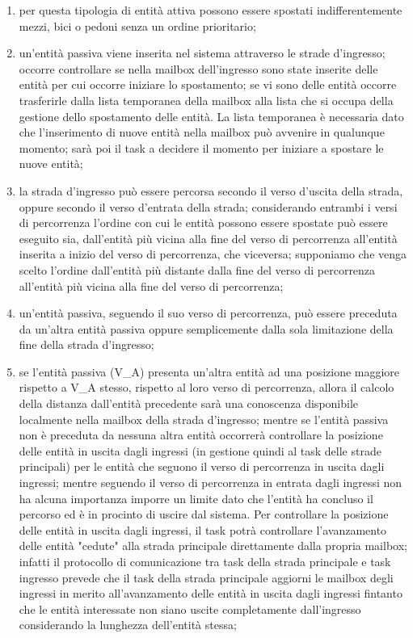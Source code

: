 \begin{enumerate}
\item per questa tipologia di entità attiva possono essere spostati indifferentemente mezzi, bici o pedoni senza un ordine prioritario;
\item un'entità passiva viene inserita nel sistema attraverso le strade d'ingresso; occorre controllare se nella mailbox dell'ingresso sono state inserite delle entità per cui occorre iniziare lo spostamento; se vi sono delle entità occorre trasferirle dalla lista temporanea della mailbox alla lista che si occupa della gestione dello spostamento delle entità. La lista temporanea è necessaria dato che l'inserimento di nuove entità nella mailbox può avvenire in qualunque momento; sarà poi il task a decidere il momento per iniziare a spostare le nuove entità;
\item la strada d'ingresso può essere percorsa secondo il verso d'uscita della strada, oppure secondo il verso d'entrata della strada; considerando entrambi i versi di percorrenza l'ordine con cui le entità possono essere spostate può essere eseguito sia, dall'entità più vicina alla fine del verso di percorrenza all'entità inserita a inizio del verso di percorrenza, che viceversa; supponiamo che venga scelto l'ordine dall'entità più distante dalla fine del verso di percorrenza all'entità più vicina alla fine del verso di percorrenza;
\item un'entità passiva, seguendo il suo verso di percorrenza, può essere preceduta da un'altra entità passiva oppure semplicemente dalla sola limitazione della fine della strada d'ingresso;
\item se l'entità passiva (V\_A) presenta un'altra entità ad una posizione maggiore rispetto a V\_A stesso, rispetto al loro verso di percorrenza, allora il calcolo della distanza dall'entità precedente sarà una conoscenza disponibile localmente nella mailbox della strada d'ingresso; mentre se l'entità passiva non è preceduta da nessuna altra entità occorrerà controllare la posizione delle entità in uscita dagli ingressi (in gestione quindi al task delle strade principali) per le entità che seguono il verso di percorrenza in uscita dagli ingressi; mentre seguendo il verso di percorrenza in entrata dagli ingressi non ha alcuna importanza imporre un limite dato che l'entità ha concluso il percorso ed è in procinto di uscire dal sistema.
Per controllare la posizione delle entità in uscita dagli ingressi, il task potrà controllare l'avanzamento delle entità "cedute" alla strada principale direttamente dalla propria mailbox; infatti il protocollo di comunicazione tra task della strada principale e task ingresso prevede che il task della strada principale aggiorni le mailbox degli ingressi in merito all'avanzamento delle entità in uscita dagli ingressi fintanto che le entità interessate non siano uscite completamente dall'ingresso considerando la lunghezza dell'entità stessa;

\end{enumerate}
